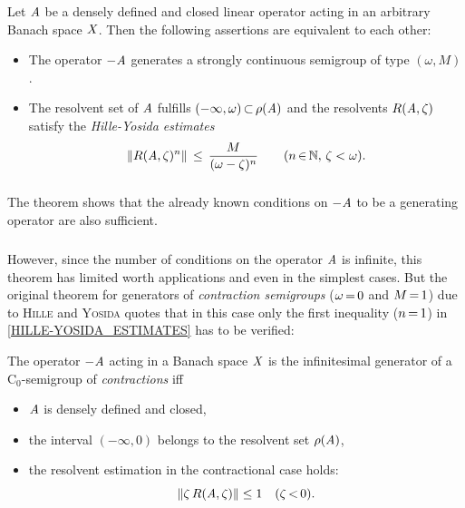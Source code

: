 \documentclass[11pt,twoside]{article}
\begin{document}
\begin{theorem}\label{MAIN_THEOREM_OF_SEMIGROUP_THEORY}
Let $\mathit{A}$ be a densely defined and closed linear operator
acting in an arbitrary Banach space $\mathit{X}$.
Then the following assertions are equivalent to each other:

\begin{itemize}[leftmargin=9mm]
\item[(a)]
The operator ${-}\mathit{A}$ generates a strongly continuous semigroup
of type $(\omega,M)$.
\item[(b)]
The resolvent set of $\mathit{A}$ fulfills $(-\infty,\omega) {\,\subset\,} \rho(\mathit{A})$
and the resolvents $R(\mathit{A},\zeta)$ satisfy the \textit{Hille-Yosida estimates}
\begin{equation}\label{HILLE-YOSIDA_ESTIMATES}
\left\lVert R(\mathit{A},\zeta)^n \right\rVert \, \leq \,
\frac{M}{(\omega - \zeta)^n} \quad \quad (n {\,\in\,} {\mathbb{N}}, \, \zeta < \omega).
\end{equation}
\end{itemize}
\end{theorem}

\subparagraph{}
The theorem shows that the already known conditions on ${-}\mathit{A}$
to be a generating operator are also sufficient.

\subparagraph{} %
However,
since the number of conditions on the operator $\mathit{A}$ is infinite,
this theorem has limited worth {\wrt} applications
and even in the simplest cases.
But the original theorem for generators of \textit{contraction semigroups}
($\omega {\,=\,} 0$ and $M {\,=\,} 1$)
due to \textsc{Hille} and \textsc{Yosida} quotes
that in this case only the first inequality
($n {\,=\,} 1$) in \eqref{HILLE-YOSIDA_ESTIMATES} has to be verified:

\begin{theorem}\label{HILLE-YOSIDA_THEOREM}
The operator ${-}\mathit{A}$ acting in a Banach space $\mathit{X}$
is the infinitesimal generator of a C$_0$-semigroup of \textit{contractions}
iff

\begin{itemize}[leftmargin=9mm]
\item[(a)]
$\mathit{A}$ is densely defined and closed,
\item[(b)]
the interval $(-\infty,0)$ belongs to the resolvent set $\rho(\mathit{A})$,
\item[(c)] the resolvent estimation in the contractional case holds:
\begin{equation}\label{RESOLVENT_ESTIMATION_HY}
\left\lVert \zeta \, R(\mathit{A},\zeta)  \right\rVert \leq 1 \quad (\zeta {\,<\,} 0).
\end{equation}
\end{itemize}
\end{theorem}
\end{document}
